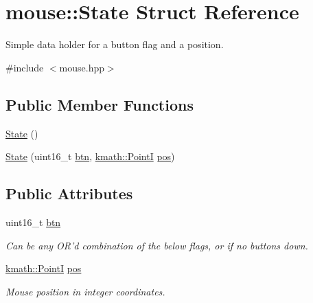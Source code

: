 \hypertarget{structmouse_1_1_state}{\section{mouse\-:\-:State Struct Reference}
\label{structmouse_1_1_state}
}


Simple data holder for a button flag and a position.  




{\ttfamily \#include $<$mouse.\-hpp$>$}

\subsection*{Public Member Functions}
\begin{DoxyCompactItemize}
\item 
\hyperlink{structmouse_1_1_state_ab91bb1dd5aa6260ab2a456581daf9ec2}{State} ()
\item 
\hyperlink{structmouse_1_1_state_adbf20ae8152479c1aea936f2d8a1e899}{State} (uint16\-\_\-t \hyperlink{structmouse_1_1_state_a27fa449d068a08894434d44c160f0f00}{btn}, \hyperlink{namespacekmath_afaf3fde3b20c9932e144eb48e736cad9}{kmath\-::\-Point\-I} \hyperlink{structmouse_1_1_state_ae4c6bba70a3c69992f7624bfc908b2c0}{pos})
\end{DoxyCompactItemize}
\subsection*{Public Attributes}
\begin{DoxyCompactItemize}
\item 
uint16\-\_\-t \hyperlink{structmouse_1_1_state_a27fa449d068a08894434d44c160f0f00}{btn}
\begin{DoxyCompactList}\small\item\em Can be any {\ttfamily O\-R}'d combination of the below flags, or {} if no buttons down. \end{DoxyCompactList}\item 
\hyperlink{namespacekmath_afaf3fde3b20c9932e144eb48e736cad9}{kmath\-::\-Point\-I} \hyperlink{structmouse_1_1_state_ae4c6bba70a3c69992f7624bfc908b2c0}{pos}
\begin{DoxyCompactList}\small\item\em Mouse position in integer coordinates. \end{DoxyCompactList}\end{DoxyCompactItemize}
